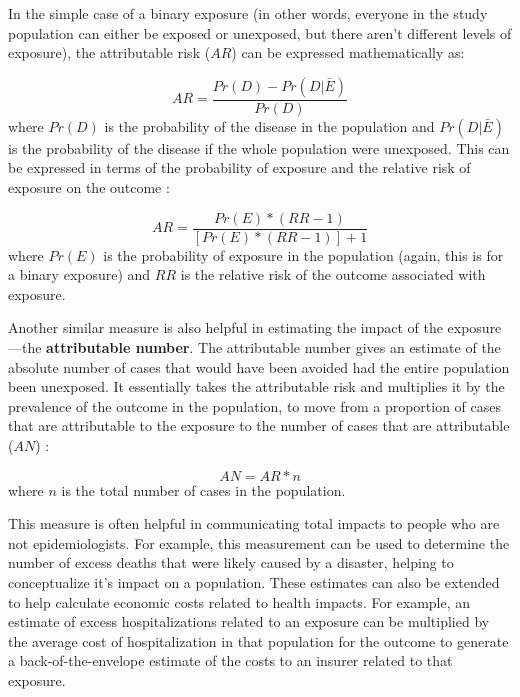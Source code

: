 \documentclass[
]{book}
\begin{document}
In the simple case of a binary exposure (in other words, everyone in the study population can either be exposed or unexposed, but there aren't different levels of exposure), the attributable risk (\(AR\)) can be expressed mathematically as:

\[
AR = \frac{Pr(D) - Pr(D|\bar{E})}{Pr(D)}
\]
where \(Pr(D)\) is the probability of the disease in the population and \(Pr(D|\bar{E})\) is the probability of the disease if the whole population were unexposed. This can be expressed in terms of the probability of exposure and the relative risk of exposure on the outcome \citep{benichou2006attributable, northridge1995public}:

\[
AR = \frac{Pr(E) * (RR-1)}{[Pr(E) * (RR-1)] + 1}
\]
where \(Pr(E)\) is the probability of exposure in the population (again, this is for a binary exposure) and \(RR\) is the relative risk of the outcome associated with exposure.

Another similar measure is also helpful in estimating the impact of the exposure---the \textbf{attributable number}. The attributable number gives an estimate of the absolute number of cases that would have been avoided had the entire population been unexposed. It essentially takes the attributable risk and multiplies it by the prevalence of the outcome in the population, to move from a proportion of cases that are attributable to the exposure to the number of cases that are attributable (\(AN\)) \citep{benichou2006attributable, northridge1995public}:

\[
AN = AR * n
\]
where \(n\) is the total number of cases in the population.

This measure is often helpful in communicating total impacts to people who are not epidemiologists. For example, this measurement can be used to determine the number of excess deaths that were likely caused by a disaster, helping to conceptualize it's impact on a population. These estimates can also be extended to help calculate economic costs related to health impacts. For example, an estimate of excess hospitalizations related to an exposure can be multiplied by the average cost of hospitalization in that population for the outcome to generate a back-of-the-envelope estimate of the costs to an insurer related to that exposure.
\end{document}
